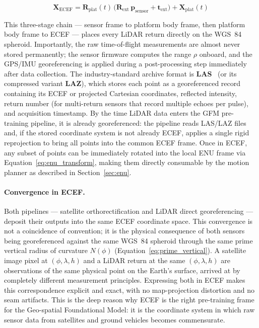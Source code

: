 \documentclass{book}
\begin{document}
\begin{equation}
  \mathbf{X}_{\text{ECEF}} =
    \mathbf{R}_{\text{plat}}(t)\,
    \bigl(\mathbf{R}_{\text{ext}}\,
    \mathbf{p}_{\text{sensor}} + \mathbf{t}_{\text{ext}}\bigr)
    + \mathbf{X}_{\text{plat}}(t)
  \label{eq:lidar_georef}
\end{equation}

This three-stage chain --- sensor frame to platform body frame, then
platform body frame to ECEF --- places every LiDAR return directly on
the WGS~84 spheroid.  Importantly, the raw time-of-flight
measurements are almost never stored permanently; the sensor firmware
computes the range $\rho$ onboard, and the GPS/IMU georeferencing is
applied during a post-processing step immediately after data
collection.  The industry-standard archive format is
\textbf{LAS}~\cite{asprs2019las} (or its compressed variant
\textbf{LAZ}), which stores each point as a georeferenced record
containing its ECEF or projected Cartesian coordinates, reflected
intensity, return number (for multi-return sensors that record
multiple echoes per pulse), and acquisition timestamp.  By the time
LiDAR data enters the GFM pre-training pipeline, it is already
georeferenced: the pipeline reads LAS/LAZ files and, if the stored
coordinate system is not already ECEF, applies a single rigid
reprojection to bring all points into the common ECEF frame.  Once in ECEF, any subset of points
can be immediately rotated into the local ENU frame via
Equation~\eqref{eq:enu_transform}, making them directly consumable
by the motion planner as described in Section~\ref{sec:enu}.

 
\paragraph{Convergence in ECEF.}

Both pipelines --- satellite orthorectification and LiDAR direct
georeferencing --- deposit their outputs into the same ECEF coordinate
space.  This convergence is not a coincidence of convention; it is the
physical consequence of both sensors being georeferenced against the
same WGS~84 spheroid through the same prime vertical radius of
curvature $N(\phi)$ (Equation~\ref{eq:prime_vertical}).  A satellite
image pixel at $(\phi, \lambda, h)$ and a LiDAR return at the same
$(\phi, \lambda, h)$ are observations of the same physical point on the
Earth's surface, arrived at by completely different measurement
principles.  Expressing both in ECEF makes this correspondence
explicit and exact, with no map-projection distortion and no seam
artifacts.  This is the deep reason why ECEF is the right pre-training
frame for the Geo-spatial Foundational Model: it is the coordinate
system in which raw sensor data from satellites and ground vehicles
becomes commensurate.
\end{document}
